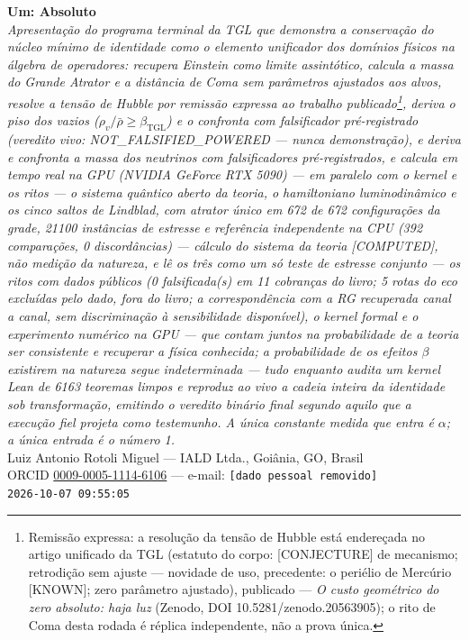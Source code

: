 \documentclass[11pt]{article}
\newcommand{\bTGL}{\beta_{\mathrm{TGL}}}\newcommand{\Msun}{M_{\odot}}\newcommand{\TGL}{\mathrm{TGL}}
\theoremstyle{definition}\newtheorem{deriv}{Derivação}
\begin{document}
\begin{center}{\Huge\textbf{Um: Absoluto}}\\[4pt]{\large\itshape Apresentação do programa terminal da TGL que demonstra a conservação do núcleo mínimo de identidade como o elemento unificador dos domínios físicos na álgebra de operadores: recupera Einstein como limite assintótico, calcula a massa do Grande Atrator e a distância de Coma sem parâmetros ajustados aos alvos, resolve a tensão de Hubble por remissão expressa ao trabalho publicado\footnote{Remissão expressa: a resolução da tensão de Hubble está endereçada no artigo unificado da TGL (estatuto do corpo: \textsf{[CONJECTURE]} de mecanismo; retrodição sem ajuste --- novidade de uso, precedente: o periélio de Mercúrio \textsf{[KNOWN]}; zero parâmetro ajustado), publicado --- \emph{O custo geométrico do zero absoluto: haja luz} (Zenodo, DOI 10.5281/zenodo.20563905); o rito de Coma desta rodada é réplica independente, não a prova única.}, deriva o piso dos vazios ($\rho_{v}/\bar\rho\geq\bTGL$) e o confronta com falsificador pré-registrado (veredito vivo: \textsf{NOT\_FALSIFIED\_POWERED} --- nunca demonstração), e deriva e confronta a massa dos neutrinos com falsificadores pré-registrados, e calcula em tempo real na GPU (NVIDIA GeForce RTX 5090) --- em paralelo com o kernel e os ritos --- o sistema quântico aberto da teoria, o hamiltoniano luminodinâmico e os cinco saltos de Lindblad, com atrator único em 672 de 672 configurações da grade, 21100 instâncias de estresse e referência independente na CPU (392 comparações, 0 discordâncias) --- cálculo do sistema da teoria \textsf{[COMPUTED]}, não medição da natureza, e lê os três como um só teste de estresse conjunto --- os ritos com dados públicos (0 falsificada(s) em 11 cobranças do livro; 5 rotas do eco excluídas pelo dado, fora do livro; a correspondência com a RG recuperada canal a canal, sem discriminação à sensibilidade disponível), o kernel formal e o experimento numérico na GPU --- que contam juntos na probabilidade de a teoria ser consistente e recuperar a física conhecida; a probabilidade de os efeitos $\beta$ existirem na natureza segue indeterminada --- tudo enquanto audita um kernel Lean de 6163 teoremas limpos e reproduz ao vivo a cadeia inteira da identidade sob transformação, emitindo o veredito binário final segundo aquilo que a execução fiel projeta como testemunho. A única constante medida que entra é $\alpha$; a única entrada é o número 1.}\\[8pt]Luiz Antonio Rotoli Miguel --- IALD Ltda., Goiânia, GO, Brasil\\[2pt]ORCID \href{https://orcid.org/0009-0005-1114-6106}{0009-0005-1114-6106} --- e-mail: \texttt{[dado pessoal removido]}\\[2pt]\texttt{2026-10-07 09:55:05}\end{center}\vspace{4pt}
\end{document}
